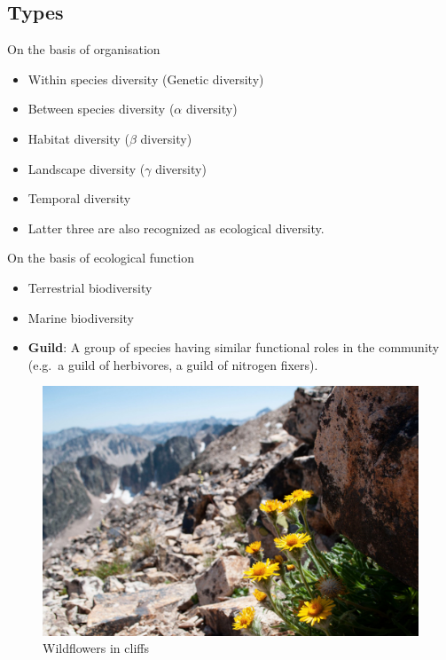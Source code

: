 \documentclass[
  ignorenonframetext,
  aspectratio=169]{beamer}
\providecommand{\tightlist}{%
  \setlength{\itemsep}{0pt}\setlength{\parskip}{0pt}}
\begin{document}
\hypertarget{types}{%
\subsection{Types}\label{types}}

\begin{frame}{On the basis of organisation}
\protect\hypertarget{on-the-basis-of-organisation}{}
\begin{itemize}
\tightlist
\item
  Within species diversity (Genetic diversity)
\item
  Between species diversity (\(\alpha\) diversity)
\item
  Habitat diversity (\(\beta\) diversity)
\item
  Landscape diversity (\(\gamma\) diversity)
\item
  Temporal diversity
\item
  Latter three are also recognized as ecological diversity.
\end{itemize}
\end{frame}

\begin{frame}{On the basis of ecological function}
\protect\hypertarget{on-the-basis-of-ecological-function}{}
\begin{itemize}
\item
  Terrestrial biodiversity
\item
  Marine biodiversity
\item
  \textbf{Guild}: A group of species having similar functional roles in
  the community (e.g.~a guild of herbivores, a guild of nitrogen
  fixers).
\end{itemize}
\end{frame}

\begin{frame}{}
\protect\hypertarget{section-12}{}
\begin{figure}
\includegraphics[width=0.7\linewidth]{./../images/wildflower_cliff_D_OOw-NXoAEuyIO} \caption{Wildflowers in cliffs}\label{fig:landscape-diversity}
\end{figure}
\end{frame}
\end{document}
